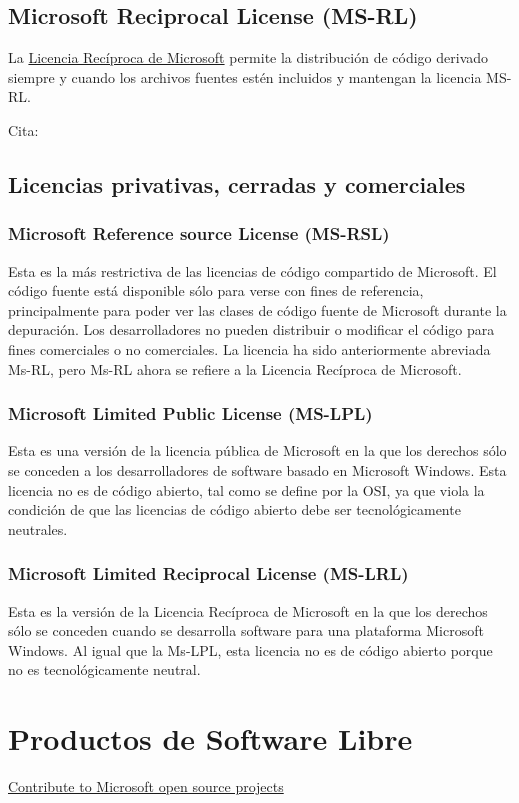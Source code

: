 \documentclass[10pt, titlepage]{article}
\begin{document}
\subsection{Microsoft Reciprocal License (MS-RL)}
La \href{https://opensource.org/licenses/MS-RL}{Licencia Recíproca de Microsoft} permite la distribución de código derivado siempre y cuando los archivos fuentes estén incluidos y mantengan la licencia MS-RL.

Cita: \cite{microsoft_reciprocal_license_msrl}
\subsection{Licencias privativas, cerradas y comerciales}
\subsubsection{Microsoft Reference source License (MS-RSL)}
Esta es la más restrictiva de las licencias de código compartido de Microsoft. El código fuente está disponible sólo para verse con fines de referencia, principalmente para poder ver las clases de código fuente de Microsoft durante la depuración. Los desarrolladores no pueden distribuir o modificar el código para fines comerciales o no comerciales. La licencia ha sido anteriormente abreviada Ms-RL, pero Ms-RL ahora se refiere a la Licencia Recíproca de Microsoft.
\subsubsection{Microsoft Limited Public License (MS-LPL)}
Esta es una versión de la licencia pública de Microsoft en la que los derechos sólo se conceden a los desarrolladores de software basado en Microsoft Windows. Esta licencia no es de código abierto, tal como se define por la OSI, ya que viola la condición de que las licencias de código abierto debe ser tecnológicamente neutrales.
\subsubsection{Microsoft Limited Reciprocal License (MS-LRL)}
Esta es la versión de la Licencia Recíproca de Microsoft en la que los derechos sólo se conceden cuando se desarrolla software para una plataforma Microsoft Windows. Al igual que la Ms-LPL, esta licencia no es de código abierto porque no es tecnológicamente neutral.
\section{Productos de Software Libre}
\href{https://opensource.microsoft.com/explore}{Contribute to Microsoft open source projects}
\end{document}
